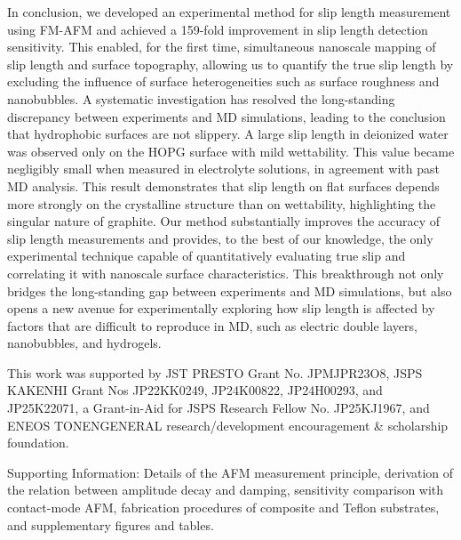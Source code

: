 \documentclass[journal=jacsat,manuscript=article]{achemso}
\begin{document}
In conclusion, we developed an experimental method for slip length measurement using FM-AFM and achieved a 159-fold improvement in slip length detection sensitivity. This enabled, for the first time, simultaneous nanoscale mapping of slip length and surface topography, allowing us to quantify the true slip length by excluding the influence of surface heterogeneities such as surface roughness and nanobubbles. A systematic investigation has resolved the long-standing discrepancy between experiments and MD simulations, leading to the conclusion that hydrophobic surfaces are not slippery. A large slip length in deionized water was observed only on the HOPG surface with mild wettability. This value became negligibly small when measured in electrolyte solutions, in agreement with past MD analysis. This result demonstrates that slip length on flat surfaces depends more strongly on the crystalline structure than on wettability, highlighting the singular nature of graphite. Our method substantially improves the accuracy of slip length measurements and provides, to the best of our knowledge, the only experimental technique capable of quantitatively evaluating true slip and correlating it with nanoscale surface characteristics. This breakthrough not only bridges the long-standing gap between experiments and MD simulations, but also opens a new avenue for experimentally exploring how slip length is affected by factors that are difficult to reproduce in MD, such as electric double layers, nanobubbles, and hydrogels. 

\begin{acknowledgement}

This work was supported by JST PRESTO Grant No. JPMJPR23O8, JSPS KAKENHI Grant Nos JP22KK0249, JP24K00822, JP24H00293, and JP25K22071, a Grant-in-Aid for JSPS Research Fellow No. JP25KJ1967, and ENEOS TONENGENERAL research/development encouragement \& scholarship foundation. 

\end{acknowledgement}

\begin{suppinfo}

Supporting Information: Details of the AFM measurement principle, derivation of the relation between amplitude decay and damping, sensitivity comparison with contact-mode AFM, fabrication procedures of composite and Teflon substrates, and supplementary figures and tables.

\end{suppinfo}
\end{document}

